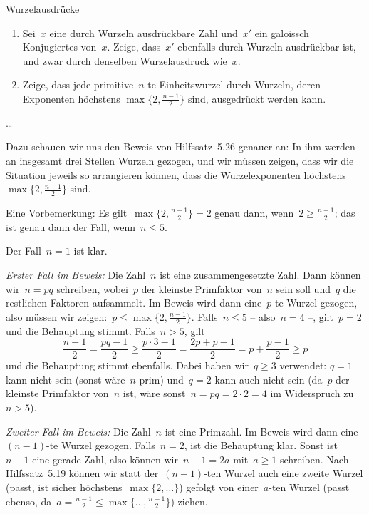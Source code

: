 \documentclass{algblatt}
\begin{document}
\begin{aufgabe}{Wurzelausdrücke}
\begin{enumerate}
\item Sei~$x$ eine durch Wurzeln ausdrückbare Zahl und~$x'$ ein galoissch
Konjugiertes von~$x$. Zeige, dass~$x'$
ebenfalls durch Wurzeln ausdrückbar ist, und zwar durch
denselben Wurzelausdruck wie~$x$.
\item Zeige, dass jede primitive~$n$-te Einheitswurzel durch Wurzeln, deren
Exponenten höchstens $\max\{ 2, \frac{n-1}{2}
\}$ sind, ausgedrückt werden kann.
\end{enumerate}

\begin{loesungE}
\item \ldots

\item Dazu schauen wir uns den Beweis von Hilfssatz~5.26 genauer an: In ihm
werden an insgesamt drei Stellen Wurzeln gezogen, und wir müssen zeigen, dass
wir die Situation jeweils so arrangieren können, dass die Wurzelexponenten
höchstens~$\max\{ 2, \frac{n-1}{2} \}$ sind.

Eine Vorbemerkung: Es gilt~$\max\{ 2, \frac{n-1}{2} \} = 2$ genau dann, wenn~$2
\geq \frac{n-1}{2}$; das ist genau dann der Fall, wenn~$n \leq 5$.

Der Fall~$n = 1$ ist klar.

\emph{Erster Fall im Beweis:} Die Zahl~$n$ ist eine zusammengesetzte Zahl. Dann
können wir~$n = p q$ schreiben, wobei~$p$ der kleinste Primfaktor von~$n$ sein
soll und~$q$ die restlichen Faktoren aufsammelt. Im Beweis wird dann eine~$p$-te
Wurzel gezogen, also müssen wir zeigen:~$p \leq \max\{ 2, \frac{n-1}{2} \}$.
Falls~$n \leq 5$ -- also~$n = 4$ --, gilt~$p = 2$ und die Behauptung stimmt.
Falls~$n > 5$, gilt
\[ \frac{n-1}{2} = \frac{pq-1}{2} \geq \frac{p\cdot3-1}{2} = \frac{2p + p-1}{2}
= p + \frac{p-1}{2} \geq p \]
und die Behauptung stimmt ebenfalls. Dabei haben wir~$q \geq 3$ verwendet: $q =
1$ kann nicht sein (sonst wäre~$n$ prim) und~$q = 2$ kann auch nicht sein
(da~$p$ der kleinste Primfaktor von~$n$ ist, wäre sonst~$n = p q = 2 \cdot 2 =
4$ im Widerspruch zu~$n > 5$).

\emph{Zweiter Fall im Beweis:} Die Zahl~$n$ ist eine Primzahl. Im Beweis wird
dann eine~$(n-1)$-te Wurzel gezogen. Falls~$n = 2$, ist die Behauptung klar.
Sonst ist~$n-1$ eine gerade Zahl, also können wir~$n-1 = 2a$ mit~$a \geq 1$
schreiben. Nach Hilfssatz~5.19 können wir statt der~$(n-1)$-ten Wurzel auch
eine zweite Wurzel (passt, ist sicher höchstens~$\max\{ 2, \ldots \}$) gefolgt
von einer~$a$-ten Wurzel (passt ebenso, da~$a = \frac{n-1}{2} \leq \max\{
\ldots, \frac{n-1}{2} \}$) ziehen.
\end{loesungE}
\end{aufgabe}
\end{document}
